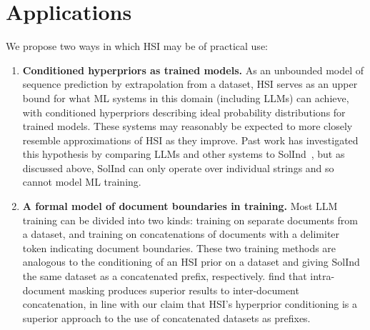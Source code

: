 \documentclass[11pt]{article}
\begin{document}
\section{Applications}

We propose two ways in which HSI may be of practical use:
\begin{enumerate}
\item \textbf{Conditioned hyperpriors as trained models.}
    As an unbounded model of sequence prediction by extrapolation from a dataset, HSI serves as an upper bound for what ML systems in this domain (including LLMs) can achieve, with conditioned hyperpriors describing ideal probability distributions for trained models.
    These systems may reasonably be expected to more closely resemble approximations of HSI as they improve. Past work has  investigated this hypothesis by comparing LLMs and other systems to SolInd~\citep{Grau-Moya2024, Young2025, Wan2024}, but as discussed above, SolInd can only operate over individual strings and so cannot model ML training.

\item \textbf{A formal model of document boundaries in training.}
    Most LLM training can be divided into two kinds: training on separate documents from a dataset, and training on concatenations of documents with a delimiter token indicating document boundaries.
    These two training methods are analogous to the conditioning of an HSI prior on a dataset and giving SolInd the same dataset as a concatenated prefix, respectively.
    \citet{Zhao2024} find that intra-document masking produces superior results to inter-document concatenation, in line with our claim that HSI's hyperprior conditioning is a superior approach to the use of concatenated datasets as prefixes.

\end{enumerate}
\end{document}
